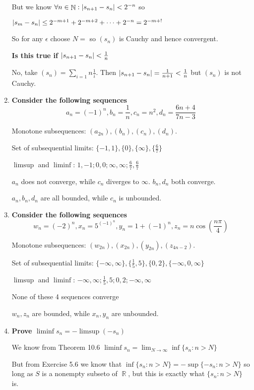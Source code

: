 \documentclass[10pt,a4paper]{article}
\DeclareMathOperator*{\R}{\mathbb{R}}
\DeclareMathOperator*{\N}{\mathbb{N}}
\DeclarePairedDelimiter{\abs}{\lvert}{\rvert}
\begin{document}
\begin{enumerate}
        But we know $\forall n \in \N: \abs{s_{n+1} - s_n} < 2^{-n}$ so 

        $\abs{s_m - s_n } \leq 2^{-m+1} + 2^{-m+2} + \cdots + 2^{-n} = 2^{-m+!}$

        So for any $\epsilon$ choose $N = $ so $(s_n)$ is Cauchy and hence convergent.

        \textbf{Is this true if $\abs{s_{n+1} - s_n} < \frac{1}{n}$ }

        No, take $(s_n) = \sum_{i=1}{n} \frac{1}{i}$. Then $\abs{s_{n+1} - s_n} = \frac{1}{n+1} < \frac{1}{n}$ but $(s_n)$ is not Cauchy.

    \item \textbf{Consider the following sequences $$a_n = (-1)^n, b_n = \frac{1}{n}, c_n = n^2, d_n = \frac{6n+4}{7n-3}$$}

        Monotone subsequences: $(a_{2n}), (b_n), (c_n ), (d_n)$.

        Set of subsequential limits: $\{-1, 1\}, \{0\}, \{\infty \}, \{\frac{6}{7}\}$

        $\limsup$ and $\liminf$: $1,-1; 0, 0; \infty, \infty; \frac{6}{7}, \frac{6}{7}$

        $a_n$ does not converge, while $c_n$ diverges to $\infty$. $b_n, d_n$ both converge.

        $a_n, b_n, d_n$ are all bounded, while $c_n$ is unbounded.

    \item \textbf{Consider the following sequences $$w_n = (-2)^n, x_n = 5^{(-1)^n}, y_n = 1 + (-1)^n, z_n = n \cos \left(\frac{n\pi}{4} \right) $$}

        Monotone subsequences: $(w_{2n}), (x_{2n}), (y_{2n} ), (z_{4n-2})$.

        Set of subsequential limits: $\{-\infty, \infty\}, \{\frac{1}{5}, 5\}, \{0, 2\}, \{ -\infty, 0, \infty\}$

        $\limsup$ and $\liminf$: $-\infty, \infty; \frac{1}{5}, 5; 0,2 ; -\infty, \infty$

        None of these 4 sequences converge

        $w_n, z_n$ are bounded, while $x_n, y_n$ are unbounded.

    \item \textbf{Prove $\liminf s_n = -\limsup (-s_n)$}

        We know from Theorem 10.6 $\liminf s_n = \lim_{N \to \infty}  \inf \{ s_n: n > N\}$

        But from Exercise 5.6 we know that $\inf \{ s_n: n > N\} = - \sup \{-s_n : n > N\}$ so long as $S$ is a nonempty subseto of $\R$, but this is exactly what $\{ s_n: n > N\}$ is.


\end{enumerate}
\end{document}
